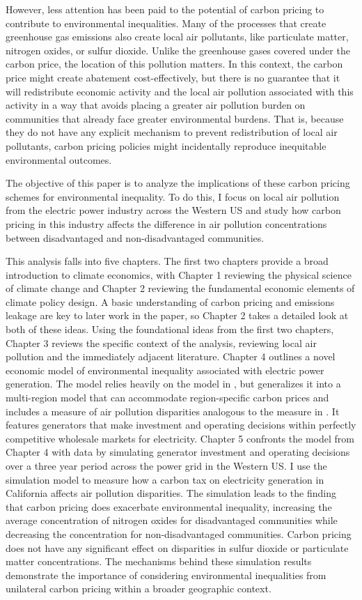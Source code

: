 However, less attention has been paid to the potential of carbon pricing to contribute to environmental inequalities. Many of the processes that create greenhouse gas emissions also create local air pollutants, like particulate matter, nitrogen oxides, or sulfur dioxide. Unlike the greenhouse gases covered under the carbon price, the location of this pollution matters. In this context, the carbon price might create abatement cost-effectively, but there is no guarantee that it will redistribute economic activity and the local air pollution associated with this activity in a way that avoids placing a greater air pollution burden on communities that already face greater environmental burdens. That is, because they do not have any explicit mechanism to prevent redistribution of local air pollutants, carbon pricing policies might incidentally reproduce inequitable environmental outcomes.

The objective of this paper is to analyze the implications of these carbon pricing schemes for environmental inequality. To do this, I focus on local air pollution from the electric power industry across the Western US and study how carbon pricing in this industry affects the difference in air pollution concentrations between disadvantaged and non-disadvantaged communities. 

This analysis falls into five chapters. The first two chapters provide a broad introduction to climate economics, with Chapter 1 reviewing the physical science of climate change and Chapter 2 reviewing the fundamental economic elements of climate policy design. A basic understanding of carbon pricing and emissions leakage are key to later work in the paper, so Chapter 2 takes a detailed look at both of these ideas. Using the foundational ideas from the first two chapters, Chapter 3 reviews the specific context of the analysis, reviewing local air pollution and the immediately adjacent literature. Chapter 4 outlines a novel economic model of environmental inequality associated with electric power generation. The model relies heavily on the model in \cite{weber2021dynamic}, but generalizes it into a multi-region model that can accommodate region-specific carbon prices and includes a measure of air pollution disparities analogous to the measure in \cite{hernandez2023environmental}. It features generators that make investment and operating decisions within perfectly competitive wholesale markets for electricity. Chapter 5 confronts the model from Chapter 4 with data by simulating generator investment and operating decisions over a three year period across the power grid in the Western US. I use the simulation model to measure how a carbon tax on electricity generation in California affects air pollution disparities. The simulation leads to the finding that carbon pricing does exacerbate environmental inequality, increasing the average concentration of nitrogen oxides for disadvantaged communities while decreasing the concentration for non-disadvantaged communities. Carbon pricing does not have any significant effect on disparities in sulfur dioxide or particulate matter concentrations. The mechanisms behind these simulation results demonstrate the importance of considering environmental inequalities from unilateral carbon pricing within a broader geographic context.

